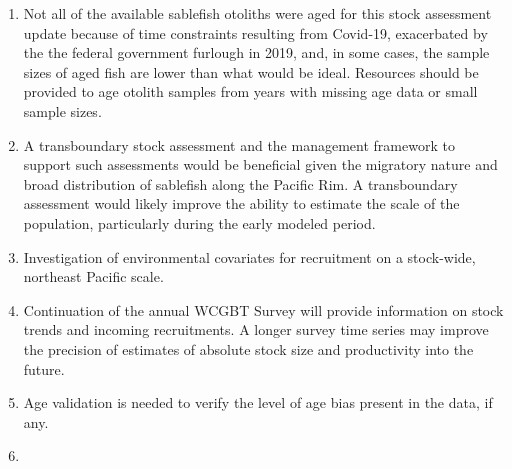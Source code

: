 \documentclass[11pt,
  english,
  a4paper,
]{article}
\begin{document}
\begin{enumerate}
\def\labelenumi{\arabic{enumi}.}
\item

  Not all of the available sablefish otoliths were aged for this stock assessment update because of time constraints resulting from Covid-19, exacerbated by the the federal government furlough in 2019, and, in some cases, the sample sizes of aged fish are lower than what would be ideal. Resources should be provided to age otolith samples from years with missing age data or small sample sizes.

  \leavevmode\tagmcend\tagstructend\par
\item

  A transboundary stock assessment and the management framework to support such assessments would be beneficial given the migratory nature and broad distribution of sablefish along the Pacific Rim. A transboundary assessment would likely improve the ability to estimate the scale of the population, particularly during the early modeled period.

  \leavevmode\tagmcend\tagstructend\par
\item

  Investigation of environmental covariates for recruitment on a stock-wide, northeast Pacific scale.

  \leavevmode\tagmcend\tagstructend\par
\item

  Continuation of the annual WCGBT Survey will provide information on stock trends and incoming recruitments. A longer survey time series may improve the precision of estimates of absolute stock size and productivity into the future.

  \leavevmode\tagmcend\tagstructend\par
\item

  Age validation is needed to verify the level of age bias present in the data, if any.

  \leavevmode\tagmcend\tagstructend\par
\item


\end{enumerate}
\end{document}

